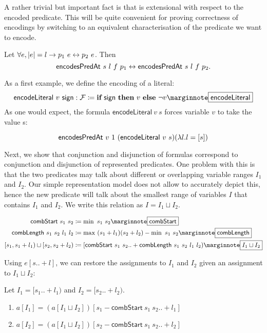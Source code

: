 A rather trivial but important fact is that \encodesPred{} is extensional with respect to the encoded predicate. This will be quite convenient for proving correctness of encodings by switching to an equivalent characterisation of the predicate we want to encode.
\begin{fact}\label{fact:enc_congruent}
  Let $\forall e, |e| = l \rightarrow p_1~e \leftrightarrow p_2~e$. Then
  \[\textsf{encodesPredAt}~s~l~f~p_1 \leftrightarrow \textsf{encodesPredAt}~s~l~f~p_2. \]
\end{fact}

\newcommand{\encodeLiteral}{\textsf{encodeLiteral}}
As a first example, we define the encoding of a literal: 
\[\encodeLiteral~v~\textsf{sign} : \formula \defeq \ITE{\textsf{sign}}{v}{\lnot v} \mnote{\encodeLiteral}\]
As one would expect, the formula $\encodeLiteral~v~s$ forces variable $v$ to take the value s: 
\begin{proposition}[Correctness of \encodeLiteral]
  \[\encodesPred~v~1~(\encodeLiteral~v~s) (\lambda l. l = [s]) \]
\end{proposition}

Next, we show that conjunction and disjunction of formulas correspond to conjunction and disjunction of represented predicates. One problem with this is that the two predicates may talk about different or overlapping variable ranges $I_1$ and $I_2$. 
Our simple representation model does not allow to accurately depict this, hence the new predicate will talk about the smallest range of variables $I$ that contains $I_1$ and $I_2$. We write this relation as $I = I_1 \sqcup I_2$.

\newcommand{\cStart}{\textsf{combStart}}
\newcommand{\cLength}{\textsf{combLength}}
\begin{align*}
  \cStart~s_1~s_2 &\defeq \min~s_1~s_2 \mnote{\cStart}\\
  \cLength~s_1~s_2~l_1~l_2 &\defeq \max~(s_1 + l_1) (s_2 + l_2) - \min~s_1~s_2 \mnote{\cLength}\\
  [s_1, s_1 + l_1) \sqcup [s_2, s_2 + l_2) &\defeq [\cStart~s_1~s_2.. +\cLength~s_1~s_2~l_1~l_2) \mnote{$I_1 \sqcup I_2$}
\end{align*}

Using $e[s..+l]$, we can restore the assignments to $I_1$ and $I_2$ given an assignment to $I_1 \sqcup I_2$:
\begin{proposition}\label{prop:comb_proj}
  Let $I_1 = [s_1 ..+ l_1)$ and $I_2 = [s_2 ..+l_2)$. 
  \begin{enumerate}
    \item $a[I_1] = (a[I_1 \sqcup I_2])[s_1 - \cStart~s_1~s_2 .. + l_1]$
    \item $a[I_2] = (a[I_1 \sqcup I_2])[s_2 - \cStart~s_1~s_2 .. + l_2]$
  \end{enumerate}
\end{proposition}

